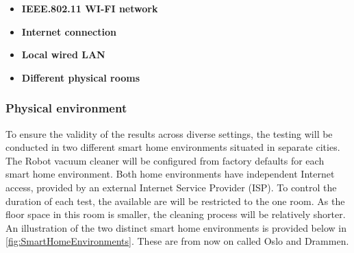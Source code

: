 \begin{itemize}
    \item \textbf{IEEE.802.11 WI-FI network}
    \item \textbf{Internet connection}
    \item \textbf{Local wired LAN}
    \item \textbf{Different physical rooms}
\end{itemize}

\subsubsection{Physical environment}
To ensure the validity of the results across diverse settings, the testing will be conducted in two different smart home environments situated in separate cities. The Robot vacuum cleaner will be configured from factory defaults for each smart home environment. Both home environments have independent Internet access, provided by an external Internet Service Provider (ISP). To control the duration of each test, the available are will be restricted to the one room. As the floor space in this room is smaller, the cleaning process will be relatively shorter. An illustration of the two distinct smart home environments is provided below in \ref{fig:SmartHomeEnvironments}. These are from now on called Oslo and Drammen.

